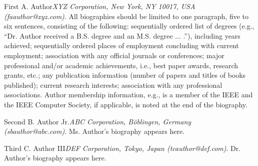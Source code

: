 \documentclass[]{IEEEibm}
\begin{document}
\begin{IEEEbiography}{First A. Author}\textit{XYZ Corporation, New York, NY 10017, USA (faauthor@xyz.com)}. All biographies should be limited to one paragraph, five to six sentences, consisting of the following: sequentially ordered list of degrees (e.g., ``Dr. Author received a B.S. degree and an M.S. degree $\ldots$ .''), including years achieved; sequentially ordered places of employment concluding with current employment; association with any official journals or conferences; major professional and/or academic achievements, i.e., best paper awards, research grants, etc.; any publication information (number of papers and titles of books published); current research interests; association with any professional associations. Author membership information, e.g., is a member of the IEEE and the IEEE Computer Society, if applicable, is noted at the end of the biography.
\end{IEEEbiography}

\begin{IEEEbiography}{Second B. Author Jr.}\textit{ABC Corporation, Böblingen, Germany (sbauthor@abc.com)}. Ms. Author’s biography appears here.
\end{IEEEbiography}

\begin{IEEEbiography}{Third C. Author III}\textit{DEF Corporation, Tokyo, Japan (tcauthor@def.com)}. Dr. Author’s biography appears here.
\end{IEEEbiography}
\end{document}
